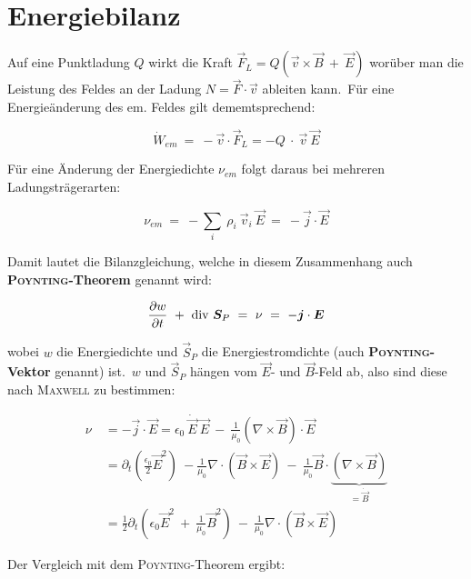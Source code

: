 \section{Energiebilanz}

Auf eine Punktladung $Q$ wirkt die Kraft $\vec{F}_L = Q(\vec{v}\times\vec{B} \ + \ \vec{E})$ worüber man die Leistung des Feldes an der Ladung $N = \vec{F}\cdot\vec{v}$ ableiten kann.\
Für eine Energieänderung des em. Feldes gilt dememtsprechend:

\begin{equation*}
\dot{W}_{em} \ = \ -\vec{v}\cdot\vec{F}_L = -Q \ \cdot \ \vec{v} \ \vec{E}
\end{equation*}

Für eine Änderung der Energiedichte $\nu_{em}$ folgt daraus bei mehreren Ladungsträgerarten:

\begin{equation*}
\nu_{em} \ =  \ - \sum_i \ \rho_i \ \vec{v}_i \ \vec{E} \ = \ - \vec{j}\cdot\vec{E}
\end{equation*}

Damit lautet die Bilanzgleichung, welche in diesem Zusammenhang auch  \textbf{\textsc{Poynting}-Theorem} genannt wird:

\begin{equation*}
\pdiff{w}{t} \ + \ \div \vec{S}_P \ = \ \nu \ = \ -\vec{j} \cdot \vec{E}
\end{equation*}

wobei $w$ die Energiedichte und $\vec{S}_P$ die Energiestromdichte (auch \textbf{\textsc{Poynting}-Vektor} genannt) ist.\
$w$ und $\vec{S}_P$ hängen vom $\vec{E}$- und $\vec{B}$-Feld ab, also sind diese nach \textsc{Maxwell} zu bestimmen:

\begin{align*}
\nu \ &= -\vec{j}\cdot\vec{E} = \epsilon_0 \ \dot{\vec{E}} \ \vec{E} \ - \ \frac{1}{\mu_0} \left(\nabla\times\vec{B}\right) \cdot \vec{E}\\
&= \partial_t \left(\frac{\epsilon_0}{2} \vec{E}^2\right) \ - \frac{1}{\mu_0} \nabla \cdot (\vec{B}\times\vec{E}) \ - \ \frac{1}{\mu_0} \vec{B}\cdot \underbrace{(\nabla\times\vec{B})}_{= \dot{\vec{B}}}\\
&= \frac{1}{2}\partial_t \left(\epsilon_0\vec{E}^2 \ + \ \frac{1}{\mu_0}\vec{B}^2\right) \ - \ \frac{1}{\mu_0}\nabla \cdot (\vec{B}\times\vec{E})
\end{align*}

Der Vergleich mit dem \textsc{Poynting}-Theorem ergibt:

